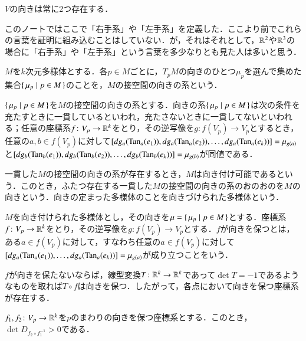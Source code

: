 \begin{que}
$V$の向きは常に2つ存在する．
\end{que}

\begin{dig}
このノートではここで「右手系」や「左手系」を定義した．ここより前でこれらの言葉を証明に組み込むことはしていない．が，それはそれとして，$\mathbb{R}^2$や$\mathbb{R}^3$の場合に「右手系」や「左手系」という言葉を多少なりとも見た人は多いと思う．
\end{dig}

\begin{defi}
$M$を$k$次元多様体とする．各$p \in M$ごとに，$T_pM$の向きのひとつ$\mu_p$を選んで集めた集合$\set{\mu_p | p \in M}$のことを，$M$の接空間の向きの系という．

$\set{\mu_p | p \in M}$を$M$の接空間の向きの系とする．向きの系$\set{\mu_p | p \in M}$は次の条件を充たすときに一貫しているといわれ，充たさないときに一貫してないといわれる；任意の座標系$f \colon V_p \to \mathbb{R}^k$をとり，その逆写像を$g \colon f(V_p) \to V_p$とするとき，任意の$a,b \in f(V_p)$に対して$[dg_a(\operatorname{Tan}_a(e_1)), dg_a(\operatorname{Tan}_a(e_2)), \dots, dg_a(\operatorname{Tan}_a(e_k))] = \mu_{g(a)}$と$[dg_b(\operatorname{Tan}_b(e_1)), dg_b(\operatorname{Tan}_b(e_2)), \dots, dg_b(\operatorname{Tan}_b(e_k))] = \mu_{g(b)}$が同値である．

一貫した$M$の接空間の向きの系が存在するとき，$M$は向き付け可能であるという．このとき，ふたつ存在する一貫した$M$の接空間の向きの系のおのおのを$M$の向きという．向きの定まった多様体のことを向きづけられた多様体という．
\end{defi}

\begin{defi}
$M$を向き付けられた多様体とし，その向きを$\mu = \set{\mu_p | p \in M}$とする．座標系$f \colon V_p \to \mathbb{R}^k$をとり，その逆写像を$g \colon f(V_p) \to V_p$とする．$f$が向きを保つとは，ある$a \in f(V_p)$に対して，すなわち任意の$a \in f(V_p)$に対して$[dg_a(\operatorname{Tan}_a(e_1)), \dots, dg_a(\operatorname{Tan}_a(e_k))] = \mu_{g(a)}$が成り立つことをいう．
\end{defi}

$f$が向きを保たないならば，線型変換$T \colon \mathbb{R}^k \to \mathbb{R}^k$であって$\det T = -1$であるようなものを取れば$T \circ f$は向きを保つ．したがって，各点において向きを保つ座標系が存在する．

\begin{lem}\label{向きを保てば座標変換の行列式は正}
$f_1, f_2 \colon V_p \to \mathbb{R}^k$を$p$のまわりの向きを保つ座標系とする．このとき，$\det D_{f_2 \circ f_1^{-1}} > 0$である．
\end{lem}

